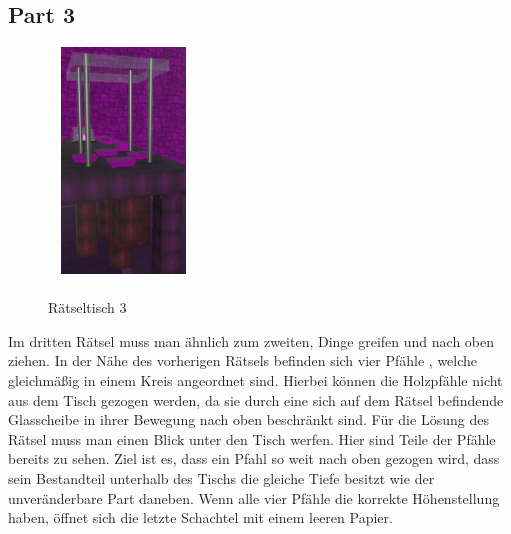 \subsection{Part 3}
\begin{figure}
	\vspace*{-1cm}
	\includegraphics[width=4cm, height=6cm]{Pictures/Tisch3}
	\caption{\\ \noindent Rätseltisch 3}
	\vspace*{-1cm}
	\label{fig:tisch3}
\end{figure}
Im dritten Rätsel muss man ähnlich zum zweiten, Dinge greifen und nach oben ziehen. In der Nähe des vorherigen Rätsels befinden sich vier Pfähle , welche gleichmäßig in einem Kreis angeordnet sind. Hierbei können die Holzpfähle nicht aus dem Tisch gezogen werden, da sie durch eine sich auf dem Rätsel befindende Glasscheibe in ihrer Bewegung nach oben beschränkt sind. Für die Lösung des Rätsel muss man einen Blick unter den Tisch werfen. Hier sind Teile der Pfähle bereits zu sehen. Ziel ist es, dass ein Pfahl so weit nach oben gezogen wird, dass sein Bestandteil unterhalb des Tischs die gleiche Tiefe besitzt wie der unveränderbare Part daneben. Wenn alle vier Pfähle die korrekte Höhenstellung haben, öffnet sich die letzte Schachtel mit einem leeren Papier.
